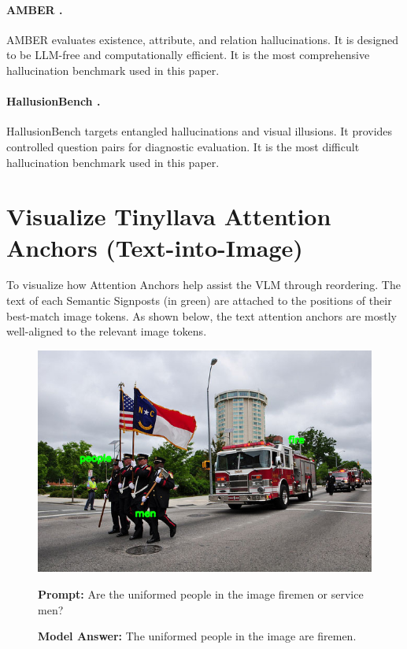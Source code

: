 \documentclass[11pt]{article}
\begin{document}
\paragraph{AMBER \citep{wang2023amber}.}
AMBER evaluates existence, attribute, and relation hallucinations. It is designed to be LLM-free and computationally efficient. It is the most comprehensive hallucination benchmark used in this paper.

\paragraph{HallusionBench \citep{guan2024hallusionbench}.}
HallusionBench targets entangled hallucinations and visual illusions. It provides controlled question pairs for diagnostic evaluation.  It is the most difficult hallucination benchmark used in this paper.


\section{Visualize Tinyllava Attention Anchors (Text-into-Image)}
\label{app:visualize_text_into_image}

To visualize how Attention Anchors help assist the VLM through reordering. The text of each Semantic Signposts (in green) are attached to the positions of their best-match image tokens. As shown below, the text attention anchors are mostly well-aligned to the relevant image tokens.

\begin{figure}[H]
    \centering
    \includegraphics[width=0.6\linewidth]{reordering_383.png}\par
    \vspace{1em}
    \raggedright
    \textbf{Prompt:} Are the uniformed people in the image firemen or service men?
    
    \textbf{Model Answer:} The uniformed people in the image are firemen.
\end{figure}
\end{document}
